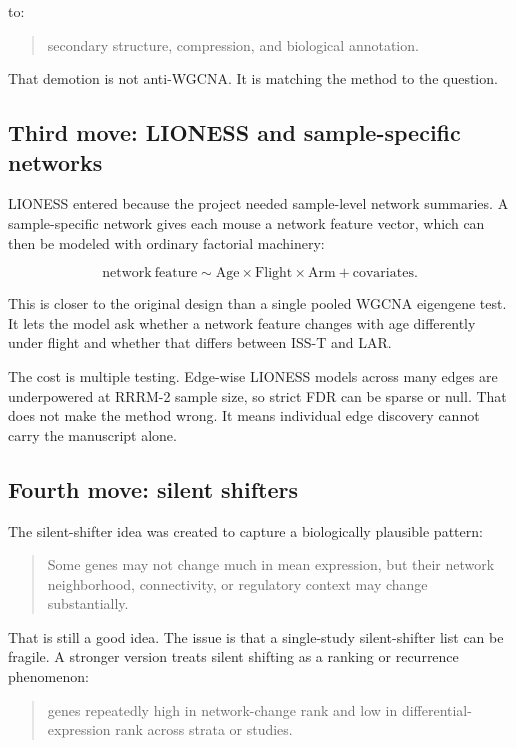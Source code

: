 \documentclass[11pt]{article}
\begin{document}
to:

\begin{quote}
secondary structure, compression, and biological annotation.
\end{quote}

That demotion is not anti-WGCNA. It is matching the method to the question.

\subsection{Third move: LIONESS and sample-specific networks}

LIONESS entered because the project needed sample-level network summaries. A
sample-specific network gives each mouse a network feature vector, which can then
be modeled with ordinary factorial machinery:

\[
  \mathrm{network\ feature} \sim
  \mathrm{Age} \times \mathrm{Flight} \times \mathrm{Arm}
  + \mathrm{covariates}.
\]

This is closer to the original design than a single pooled WGCNA eigengene test.
It lets the model ask whether a network feature changes with age differently
under flight and whether that differs between ISS-T and LAR.

The cost is multiple testing. Edge-wise LIONESS models across many edges are
underpowered at RRRM-2 sample size, so strict FDR can be sparse or null. That
does not make the method wrong. It means individual edge discovery cannot carry
the manuscript alone.

\subsection{Fourth move: silent shifters}

The silent-shifter idea was created to capture a biologically plausible pattern:

\begin{quote}
Some genes may not change much in mean expression, but their network
neighborhood, connectivity, or regulatory context may change substantially.
\end{quote}

That is still a good idea. The issue is that a single-study silent-shifter list
can be fragile. A stronger version treats silent shifting as a ranking or
recurrence phenomenon:

\begin{quote}
genes repeatedly high in network-change rank and low in differential-expression
rank across strata or studies.
\end{quote}
\end{document}
